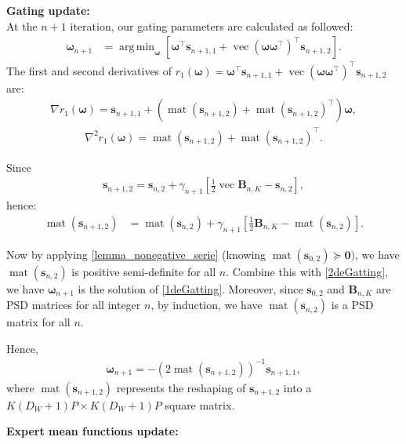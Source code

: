 \documentclass{article}
\newcommand{\zero}{\ensuremath{\mathbf{0}}}
\DeclareMathOperator*{\vect}{vec} %
\DeclareMathOperator*{\mat}{mat}
\def\vomega{{\bm{\omega}}}
\def\vs{{\bm{s}}}
\def\mB{{\bm{B}}}
\DeclareMathOperator*{\argmin}{arg\,min}
\begin{document}
\textbf{Gating update:}\\
At the $n+1$ iteration, our gating parameters are calculated as followed:
\begin{align*}
    \vomega_{n+1}&=\displaystyle\argmin_{\vomega}\left[\vomega^{\top} \vs_{n+1,1}+\vect(\vomega\vomega^{\top})^{\top}\vs_{n+1,2}\right].
\end{align*}
The first and second derivatives of $r_1(\vomega)=\vomega^{\top}\vs_{n+1,1}+\vect(\vomega\vomega^{\top})^{\top}\vs_{n+1,2}$ are:
\begin{align} \label{1deGatting}
   \nabla r_1(\vomega)=\vs_{n+1,1}+(\mat(\vs_{n+1,2})+\mat(\vs_{n+1,2})^{\top})\vomega,
\end{align}
\begin{align} \label{2deGatting}
   \nabla^2 r_1(\vomega)=\mat(\vs_{n+1,2})+\mat(\vs_{n+1,2})^{\top}.
\end{align}
\par Since
\begin{align*}
    \vs_{n+1,2}=\vs_{n,2}+\gamma_{n+1}\left[\frac{1}{2}\vect\mB_{n,K}-\vs_{n,2}\right],
\end{align*}
hence:
\begin{align*}
    \mat(\vs_{n+1,2})
    &=\mat(\vs_{n,2})+\gamma_{n+1}\left[\frac{1}{2}\mB_{n,K}-\mat(\vs_{n,2})\right].
\end{align*}
\par Now by applying \cref{lemma_nonegative_serie} (knowing $\mat(\vs_{0,2})\succeq \zero)$, we have $\mat(\vs_{n,2})$ is positive semi-definite for all $n$. Combine this with \cref{2deGatting}, we have $\vomega_{n+1}$ is the solution of \cref{1deGatting}. Moreover, since $\vs_{0,2}$ and $\mB_{n,K}$ are PSD matrices for all integer $n$, 
 by induction, we have $\mat(\vs_{n,2})$ is a PSD matrix for all $n$. 

Hence,
\begin{align*}
\vomega_{n+1} = -\left(2\mat(\vs_{n+1,2})\right)^{-1} \vs_{n+1,1},
\end{align*}
where $\mat(\vs_{n+1,2})$ represents the reshaping of $\vs_{n+1,2}$ into a $K(D_W+1)P \times K(D_W+1)P$ square matrix.

\textbf{Expert mean functions update:}
\end{document}
